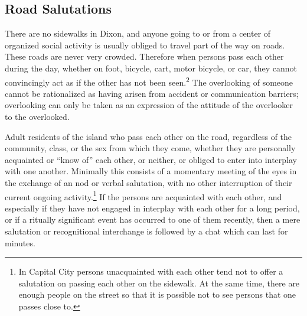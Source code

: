 \documentclass[twoside,symmetric,nobib,justified]{tufte-book}
\begin{document}
\hypertarget{road-salutations}{%
\subsection{Road Salutations}\label{road-salutations}}

There are no sidewalks in Dixon, and anyone going to or from a center of
organized social activity is usually obliged to travel part of the way
on roads. These roads are never very crowded. Therefore when persons
pass each other during the day, whether on foot, bicycle, cart, motor
bicycle, or car, they cannot convincingly act as if the other has not
been seen.\textsuperscript{2} The overlooking of someone cannot be rationalized as
having arisen from accident or communication barriers; overlooking can
only be taken as an expression of the attitude of the overlooker to the
overlooked.

Adult residents of the island who pass each other on the road,
regardless of the community, class, or the sex from which they come,
whether they are personally acquainted or ``know of'' each other, or
neither, or obliged to enter into interplay with one another. Minimally
this consists of a momentary meeting of the eyes in the exchange of an
nod or verbal salutation, with no other interruption of their current
ongoing activity.\footnote{In Capital City persons unacquainted with
  each other tend not to offer a salutation on passing each other on the
  sidewalk. At the same time, there are enough people on the street so
  that it is possible not to see persons that one passes close to.} If
the persons are acquainted with each other, and especially if they have
not engaged in interplay with each other for a long period, or if a
ritually significant event has occurred to one of them recently, then a
mere salutation or recognitional interchange is followed by a chat which
can last for minutes.
\end{document}
